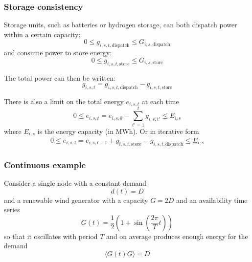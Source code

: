 \documentclass[10pt,dvipsnames]{beamer}
\begin{document}
\begin{frame}
  \frametitle{Storage consistency}

  Storage units, such as batteries or hydrogen storage, can both
  dispatch power within a certain capacity:
  \begin{equation*}
    0 \leq g_{i,s,t,\textrm{dispatch}} \leq G_{i,s,\textrm{dispatch}}
  \end{equation*}
  and consume power to store energy:
  \begin{equation*}
    0 \leq g_{i,s,t,\textrm{store}} \leq G_{i,s,\textrm{store}}
  \end{equation*}

  The total power can then be written:
  \begin{equation*}
    g_{i,s,t} = g_{i,s,t,\textrm{dispatch}}  - g_{i,s,t,\textrm{store}}
  \end{equation*}

  There is also a limit on the total energy $e_{i,s,t}$ at each time
  \begin{equation*}
    0 \leq e_{i,s,t} = e_{i,s,0} -\sum_{t'=1}^{t} g_{i,s,t'} \leq E_{i,s}
  \end{equation*}
  where $E_{i,s}$ is the energy capacity (in MWh). Or in iterative form
  \begin{align*}
    0 \leq e_{i,s,t} = e_{i,s,t-1} + g_{i,s,t,\textrm{store}} -  g_{i,s,t,\textrm{dispatch}} \leq E_{i,s}
  \end{align*}

\end{frame}

\begin{frame}
  \frametitle{Continuous example}

  Consider a single node with a constant demand
  \begin{equation*}
    d(t) = D
  \end{equation*}
  and a renewable wind generator with a capacity $G = 2D$ and an
  availability time series
  \begin{equation*}
    G(t) = \frac{1}{2} \left(1 + \sin\left(\frac{2\pi}{T} t\right)\right)
  \end{equation*}
  so that it oscillates with period $T$ and on average produces enough energy for the demand
  \begin{equation*}
    \langle G(t) G \rangle = D
  \end{equation*}

\end{frame}
\end{document}
